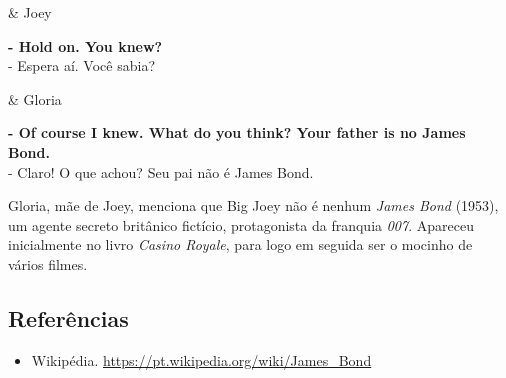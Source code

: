 \begin{tcolorbox}[enhanced,center upper,
    drop fuzzy shadow southeast, boxrule=0.3pt,
    lower separated=false, breakable,
    colframe=black!30!dialogoBorder,colback=white]
\begin{minipage}[c]{0.16\linewidth}
   & \centering \scriptsize{Joey}
\end{minipage}
\hfill
\begin{minipage}[c]{0.8\linewidth}
  \textbf{- Hold on. You knew?}\\
  - Espera aí. Você sabia?
\end{minipage}

\medskip
\begin{minipage}[c]{0.16\linewidth}
   & \centering \scriptsize{Gloria}
\end{minipage}
\hfill
\begin{minipage}[c]{0.8\linewidth}
  \textbf{- Of course I knew. What do you think? Your father is no James Bond.}\\
  - Claro! O que achou? Seu pai não é James Bond.
\end{minipage}
\end{tcolorbox}

Gloria, mãe de Joey, menciona que Big Joey não é nenhum \emph{James
Bond} (1953), um agente secreto britânico fictício, protagonista da
franquia \emph{007}. Apareceu inicialmente no livro \emph{Casino
Royale}, para logo em seguida ser o mocinho de vários filmes.

\hypertarget{referuxeancias-2}{%
\subsection{Referências}\label{referuxeancias-2}}

\begin{itemize}
\tightlist
\item
  \sloppy Wikipédia. \url{https://pt.wikipedia.org/wiki/James_Bond}
\end{itemize}

